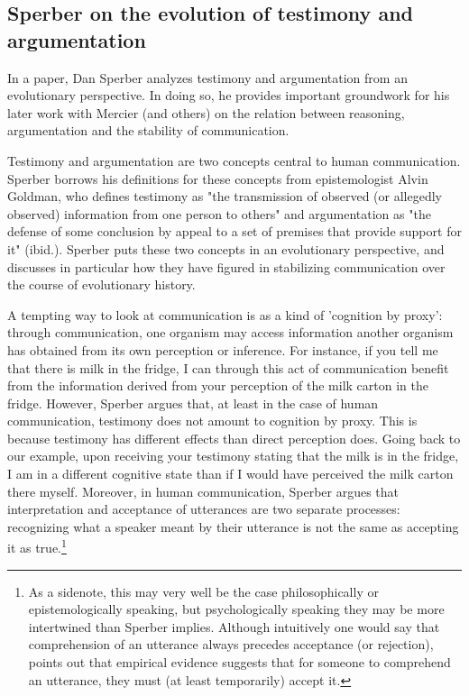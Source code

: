 \subsection{Sperber on the evolution of testimony and argumentation}
\label{sec:Sperber01}

In a \citeyear{Sperber01} paper, Dan Sperber analyzes testimony and argumentation from an evolutionary perspective. In doing so, he provides important groundwork for his later work with Mercier (and others) on the relation between reasoning, argumentation and the stability of communication.

Testimony and argumentation are two concepts central to human communication. Sperber borrows his definitions for these concepts from epistemologist Alvin Goldman, who defines testimony as "the transmission of observed (or allegedly observed) information from one person to others" \citep[p.~401]{Sperber01} and argumentation as "the defense of some conclusion by appeal to a set of premises that provide support for it" (ibid.).
Sperber puts these two concepts in an evolutionary perspective, and discusses in particular how they have figured in stabilizing communication over the course of evolutionary history.

A tempting way to look at communication is as a kind of 'cognition by proxy': through communication, one organism may access information another organism has obtained from its own perception or inference. For instance, if you tell me that there is milk in the fridge, I can through this act of communication benefit from the information derived from your perception of the milk carton in the fridge.
However, Sperber argues that, at least in the case of human communication, testimony does not amount to cognition by proxy. This is because testimony has different effects than direct perception does. Going back to our example, upon receiving your testimony stating that the milk is in the fridge, I am in a different cognitive state than if I would have perceived the milk carton there myself. Moreover, in human communication, Sperber argues that interpretation and acceptance of utterances are two separate processes: recognizing what a speaker meant by their utterance is not the same as accepting it as true.\footnote{As a sidenote, this may very well be the case philosophically or epistemologically speaking, but psychologically speaking they may be more intertwined than Sperber implies. Although intuitively one would say that comprehension of an utterance always precedes acceptance (or rejection), \citet{Lewandowsky12} points out that empirical evidence suggests that for someone to comprehend an utterance, they must (at least temporarily) accept it.}

